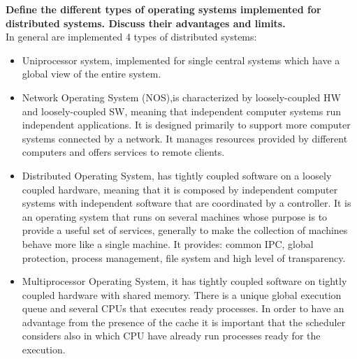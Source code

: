 \textbf{Define the different types of operating systems implemented for distributed systems. Discuss their advantages and limits.}\\
In general are implemented 4 types of distributed systems:
\begin{itemize}
	\item Uniprocessor system, implemented for single central systems which have a global view of the entire system.
	\item Network Operating System (NOS),is characterized by loosely-coupled HW and loosely-coupled SW, meaning that independent computer systems run independent applications. It is designed primarily to support more computer systems connected by a network. It manages resources provided by different computers and offers services to remote clients.
	\item Distributed Operating System, has tightly coupled software on a loosely coupled hardware, meaning that it is composed by independent computer systems with independent software that are coordinated by a controller. It is an operating system that runs on several machines whose purpose is to provide a useful set of services, generally to make the collection of machines behave more like a single machine. It provides: common IPC, global protection, process management, file system and high level of transparency.
	\item Multiprocessor Operating System, it has tightly coupled software on tightly coupled hardware with shared memory. There is a unique global execution queue and several CPUs that executes ready processes. In order to have an advantage from the presence of the cache it is important that the scheduler considers also in which CPU have already run processes ready for the execution.
\end{itemize}


